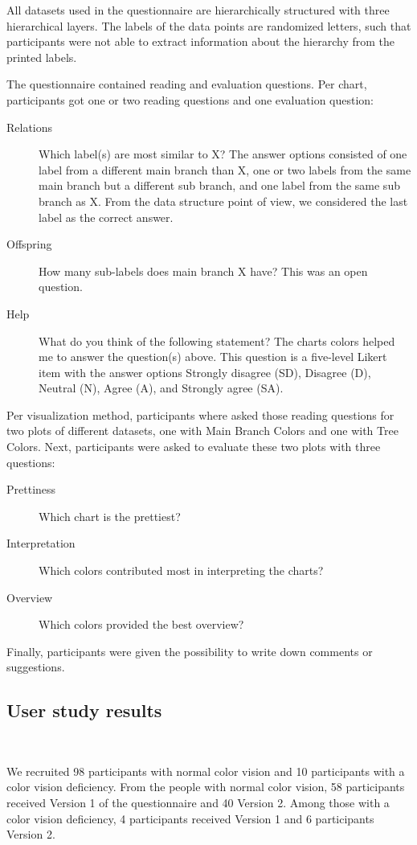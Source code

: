 \documentclass[journal]{vgtc}                %
\begin{document}
All datasets used in the questionnaire are hierarchically structured with three hierarchical layers. The 
labels of the data points are randomized letters, such that participants were not able to extract information 
about the hierarchy from the printed labels.

The questionnaire contained reading and evaluation questions. Per chart, participants got one or two reading questions and one evaluation question:
\begin{description}
\item[Relations] Which label(s) are most similar to X? The answer options consisted of one label from a different main branch than X, one or two labels from the same main branch but a different sub branch, and one label from the same sub branch as X. From the data structure point of view, we considered the last label as the correct answer.
\item[Offspring] How many sub-labels does main branch X have? This was an open question.
\item[Help] What do you think of the following statement? The charts colors helped me to answer the question(s) above. This question is a five-level Likert item with the answer options Strongly disagree (SD), Disagree (D), Neutral (N), Agree (A), and Strongly agree (SA).
\end{description}
Per visualization method, participants where asked those reading questions for two plots of different datasets, one with Main Branch Colors and one with Tree Colors. 
Next, participants were asked to evaluate these two plots with three questions:
\begin{description}
\item[Prettiness] Which chart is the prettiest?
\item[Interpretation] Which colors contributed most in interpreting the charts?
\item[Overview] Which colors provided the best overview?
\end{description}
Finally, participants were given the possibility to write down comments or suggestions.

\subsection{User study results}~\label{secuserres}

We recruited 98 participants with normal color vision and 10 participants with a color vision deficiency. From the people with normal color vision, 58 participants received Version 1 of the questionnaire and 40 Version 2. Among those with a color vision deficiency, 4 participants received Version 1 and 6 participants Version 2.
\end{document}
